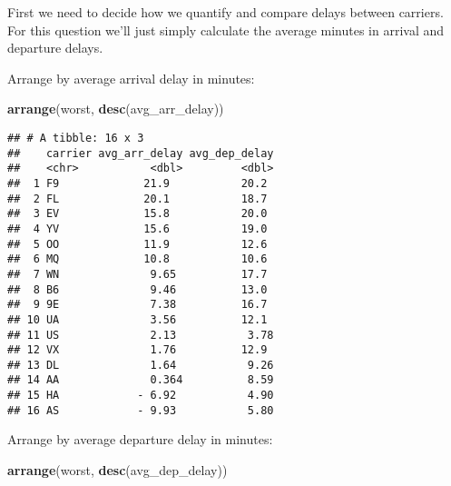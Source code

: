 \documentclass[]{article}
\newenvironment{Shaded}{\begin{snugshade}}{\end{snugshade}}
\newcommand{\KeywordTok}[1]{\textcolor[rgb]{0.13,0.29,0.53}{\textbf{#1}}}
\newcommand{\DataTypeTok}[1]{\textcolor[rgb]{0.13,0.29,0.53}{#1}}
\newcommand{\StringTok}[1]{\textcolor[rgb]{0.31,0.60,0.02}{#1}}
\newcommand{\OtherTok}[1]{\textcolor[rgb]{0.56,0.35,0.01}{#1}}
\newcommand{\OperatorTok}[1]{\textcolor[rgb]{0.81,0.36,0.00}{\textbf{#1}}}
\newcommand{\NormalTok}[1]{#1}
\theoremstyle{definition}
\theoremstyle{definition}
\theoremstyle{definition}
\theoremstyle{remark}
\begin{document}
First we need to decide how we quantify and compare delays between
carriers. For this question we'll just simply calculate the average
minutes in arrival and departure delays.

\begin{Shaded}
\end{Shaded}

Arrange by average arrival delay in minutes:

\begin{Shaded}
\begin{Highlighting}[]
\KeywordTok{arrange}\NormalTok{(worst, }\KeywordTok{desc}\NormalTok{(avg_arr_delay))}
\end{Highlighting}
\end{Shaded}

\begin{verbatim}
## # A tibble: 16 x 3
##    carrier avg_arr_delay avg_dep_delay
##    <chr>           <dbl>         <dbl>
##  1 F9             21.9           20.2 
##  2 FL             20.1           18.7 
##  3 EV             15.8           20.0 
##  4 YV             15.6           19.0 
##  5 OO             11.9           12.6 
##  6 MQ             10.8           10.6 
##  7 WN              9.65          17.7 
##  8 B6              9.46          13.0 
##  9 9E              7.38          16.7 
## 10 UA              3.56          12.1 
## 11 US              2.13           3.78
## 12 VX              1.76          12.9 
## 13 DL              1.64           9.26
## 14 AA              0.364          8.59
## 15 HA            - 6.92           4.90
## 16 AS            - 9.93           5.80
\end{verbatim}

Arrange by average departure delay in minutes:

\begin{Shaded}
\begin{Highlighting}[]
\KeywordTok{arrange}\NormalTok{(worst, }\KeywordTok{desc}\NormalTok{(avg_dep_delay))}
\end{Highlighting}
\end{Shaded}
\end{document}
